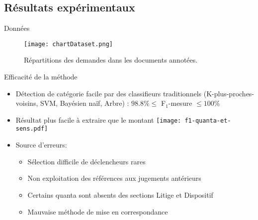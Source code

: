 \subsection{Résultats expérimentaux}
\begin{frame}[t]{\mysubsectiontitle}
	Données
	\begin{figure}[!htb]
		\texttt{[image: chartDataset.png]}
		\caption{\scriptsize Répartitions des demandes dans les documents annotées.}\label{fig:quanta:hist-repartition-docs}
	\end{figure}	
\end{frame}


\begin{frame}[t]{\mysubsectiontitle}
	Efficacité de la méthode
	\begin{itemize} \scriptsize
		\item Détection de catégorie facile par des classifieurs traditionnels (K-plus-proches-voisins, SVM, Bayésien naïf, Arbre) : $98.8\% \leq$ F$_1$-mesure $\leq 100\%$
		\item Résultat plus facile à extraire que le montant
			\texttt{[image: f1-quanta-et-sens.pdf]}			
		\item Source d'erreurs:
		\begin{itemize} \scriptsize
			\item Sélection	difficile de déclencheurs rares
			\item Non exploitation des références aux jugements antérieurs
			\item Certains quanta sont absents des sections Litige et Dispositif
			\item Mauvaise méthode de mise en correspondance
		\end{itemize}
	\end{itemize}
\end{frame}
